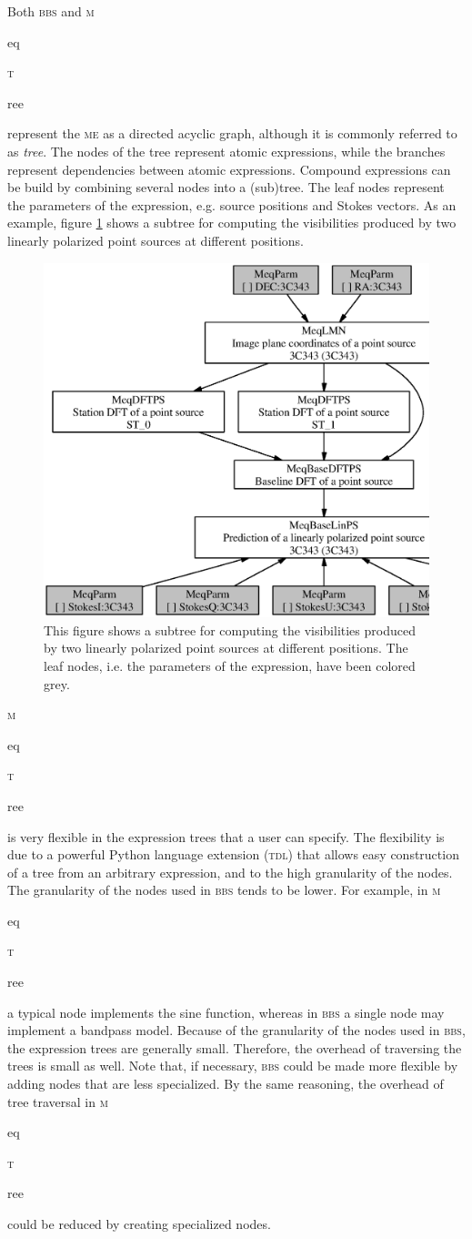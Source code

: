 \documentclass[10pt]{lofar}
\newcommand{\bbs}{\textsc{bbs}\xspace}
\newcommand{\me}{\textsc{me}\xspace}
\newcommand{\meqtree}{\textsc{m}\begin{footnotesize}eq\end{footnotesize}\textsc{t}\begin{footnotesize}ree\end{footnotesize}\xspace}
\begin{document}
Both \bbs and \meqtree represent the \me as a directed acyclic graph, although it is commonly referred to as \emph{tree}. The nodes of the tree represent atomic expressions, while the branches represent dependencies between atomic expressions. Compound expressions can be build by combining several nodes into a (sub)tree. The leaf nodes represent the parameters of the expression, e.g. source positions and Stokes vectors. As an example, figure \ref{fig:expr_tree} shows a subtree for computing the visibilities produced by two linearly polarized point sources at different positions.
\begin{figure}[htbp]
\centering
\includegraphics[width=\textwidth]{images/expr_graph_sdd.ps}
\caption{This figure shows a subtree for computing the visibilities produced by two linearly polarized point sources at different positions. The leaf nodes, i.e. the parameters of the expression, have been colored grey.}
\label{fig:expr_tree}
\end{figure}

\meqtree is very flexible in the expression trees that a user can specify. The flexibility is due to a powerful Python language extension (\textsc{tdl}) that allows easy construction of a tree from an arbitrary expression, and to the high granularity of the nodes. The granularity of the nodes used in \bbs tends to be lower. For example, in \meqtree a typical node implements the sine function, whereas in \bbs a single node may implement a bandpass model. Because of the granularity of the nodes used in \bbs, the expression trees are generally small. Therefore, the overhead of traversing the trees is small as well. Note that, if necessary, \bbs could be made more flexible by adding nodes that are less specialized. By the same reasoning, the overhead of tree traversal in \meqtree could be reduced by creating specialized nodes.
\end{document}

